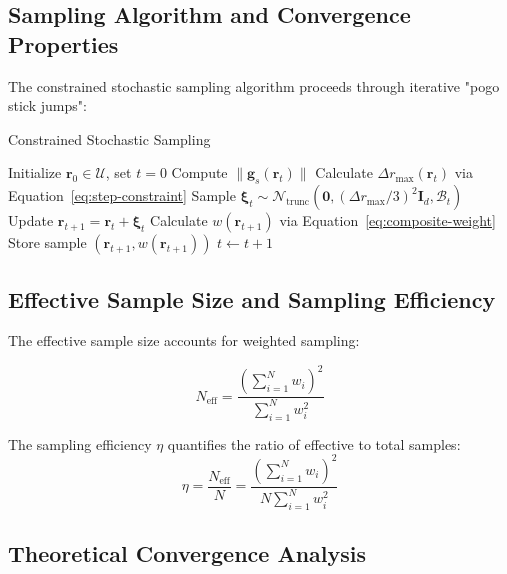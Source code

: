 \subsection{Sampling Algorithm and Convergence Properties}

The constrained stochastic sampling algorithm proceeds through iterative "pogo stick jumps":

\begin{algorithm}[H]
\caption{Constrained Stochastic Sampling}
\begin{algorithmic}[1]
\STATE Initialize $\mathbf{r}_0 \in \mathcal{U}$, set $t = 0$
    \STATE Compute $\|\mathbf{g}_s(\mathbf{r}_t)\|$
    \STATE Calculate $\Delta r_{\max}(\mathbf{r}_t)$ via Equation~\eqref{eq:step-constraint}
    \STATE Sample $\boldsymbol{\xi}_t \sim \mathcal{N}_{\text{trunc}}(\mathbf{0}, (\Delta r_{\max}/3)^2 \mathbf{I}_d, \mathcal{B}_t)$
    \STATE Update $\mathbf{r}_{t+1} = \mathbf{r}_t + \boldsymbol{\xi}_t$
    \STATE Calculate $w(\mathbf{r}_{t+1})$ via Equation~\eqref{eq:composite-weight}
    \STATE Store sample $(\mathbf{r}_{t+1}, w(\mathbf{r}_{t+1}))$
    \STATE $t \leftarrow t + 1$
\ENDWHILE
\end{algorithmic}
\end{algorithm}

\subsection{Effective Sample Size and Sampling Efficiency}

The effective sample size accounts for weighted sampling:

\begin{equation}
N_{\text{eff}} = \frac{\left(\sum_{i=1}^N w_i\right)^2}{\sum_{i=1}^N w_i^2}
\label{eq:effective-sample-size-constrained}
\end{equation}

\begin{definition}
The sampling efficiency $\eta$ quantifies the ratio of effective to total samples:
\begin{equation}
\eta = \frac{N_{\text{eff}}}{N} = \frac{\left(\sum_{i=1}^N w_i\right)^2}{N \sum_{i=1}^N w_i^2}
\label{eq:sampling-efficiency}
\end{equation}
\end{definition}

\subsection{Theoretical Convergence Analysis}

